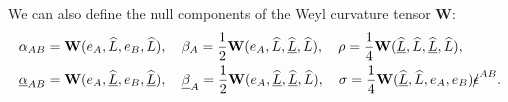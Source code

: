\documentclass[11pt,reqno]{amsart}
\theoremstyle{definition}
\numberwithin{equation}{section}
\newcommand{\D}{\mathrm{d}}
\newcommand{\tr}{\mathrm{tr}}
\def\alphab{\underline{\alpha}}
\def\betab{\underline{\beta}}
\def\chib{\underline{\chi}}
\def\tr{\mathrm{tr}}
\def\ub{\underline{u}}
\def\Cb{\underline{C}}
\def\Lh{\widehat{L}}
\def\Lbh{\widehat{\underline{L}}}
\def\gs{\mbox{$g \mkern -9mu /$}}
\def\epsilons{\mbox{$\epsilon \mkern -9mu /$}}
\begin{document}
We can also define the null components of the Weyl curvature tensor
{\bf W}:
\begin{align*}
\alpha_{AB}&=\mathbf{W}(e_A,\Lh,e_B,\Lh),\quad\beta_A=\frac{1}{2}\mathbf{W}(e_A,\Lh,\Lbh,\Lh),\quad\rho=\frac{1}{4}\mathbf{W}(\Lbh,\Lh,\Lbh,\Lh),\\
\alphab_{AB}&=\mathbf{W}(e_A,\Lbh,e_B,\Lbh),\quad\betab_A=\frac{1}{2}\mathbf{W}(e_A,\Lbh,\Lbh,\Lh),\quad\sigma=\frac{1}{4}\mathbf{W}(\Lbh,\Lh,e_A,e_B)\epsilons^{AB}.
\end{align*}


\begin{comment}
The spacetime we consider is spherically symmetric in the past of some incoming null hypersurface, which we denote by $\Cb_0$, and totally non-symmetric in the future of that. Let us denote the vertex of the incoming null hypersurface by $O$, the central line by $\Gamma$ which goes through $O$ and is a timelike geodesic.
Since $\Cb_0$ is the spherically symmetric, we can define the area radius $r$ and mass $m$ as in \cite{Chr} by
\begin{equation*}
  4\pi r^2=Area{S_{\ub,u}}, m=\frac{r}{8\pi}\int_{S_{\ub,u}}(K+\frac{1}{4}\tr\chi\tr\chib)\D\mu_{\gs},
  \end{equation*}
where $K$ is the Gauss curvature of the sphere.

We choose an outgoing light cone $C_0$ as one of the initial null hypersurface, whose vertex is on $\Gamma$ and intersects $\Cb_0$ at the two-sphere $S_0$. Let's denote the area radius of $S_0$ by $r_0$. The double null foliation will be chosen to be such that $u=-r,\ub=0$ on $\Cb_0$ and $\ub$ is the affine parameter of $C_0$. This means that $\Omega\tr\chib=-\frac{2}{r}$ on $\Cb_0$ and $
\Omega$ is constant on $C_0$, we may as well make it to be $\Omega(\ub,u=0)=1$.\\


\end{comment}
\end{document}
